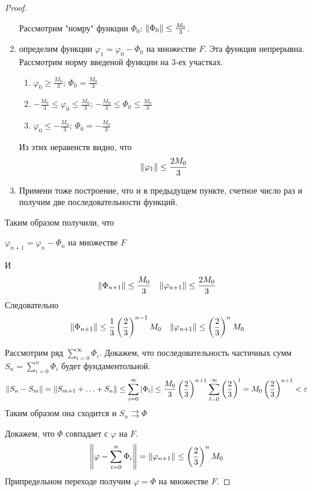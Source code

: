 \begin{proof}
\begin{enumerate}
        Рассмотрим "номру" функции $\Phi_0$: $\left\|\Phi_0\right\| \leq \frac{M_0}{3}$.
        \item определим функции $\varphi_1 = \varphi_0 - \Phi_0$ на множестве $F$. Эта функция непрерывна. Рассмотрим норму введеной функции на 3-ех участках.
        \begin{enumerate}
            \item $\varphi_0 \geq \frac{M_0}{3}$; $\Phi_0 = \frac{M_0}{3}$
            \item $ - \frac{M_0}{3} \leq \varphi_0 \leq \frac{M_0}{3}$; $-\frac{M_0}{3} \leq \Phi_0 \leq \frac{M_0}{3}$
            \item $\varphi_0 \leq -\frac{M_0}{3}$; $\Phi_0 = -\frac{M_0}{3}$
        \end{enumerate}
        Из этих неравенств видно, что
        \[
            \left\|\varphi_1\right\| \leq \frac{2 M_0}{3}
        \]
        \item Примени тоже построение, что и в предыдущем пункте, счетное число раз и получим две последовательности функций. 
    \end{enumerate}

    Таким образом получили, что
    \begin{center}
        $\varphi_{n + 1} = \varphi_n - \Phi_n$ на множестве $F$
    \end{center}
    И
    \begin{align}
        & \left\|\Phi_{n + 1}\right\| \leq \frac{M_0}{3}
        & \left\|\varphi_{n + 1}\right\| \leq \frac{2 M_0}{3}
    \end{align}
    Следовательно
    \begin{align}
        & \left\|\Phi_{n + 1}\right\| \leq \frac{1}{3} \left(\frac{2}{3}\right)^{n - 1} M_0
        & \left\|\varphi_{n + 1}\right\| \leq \left(\frac{2}{3}\right)^n M_0
    \end{align}

    Рассмотрим ряд $\sum_{i = 0}^{\infty}\Phi_i$. Докажем, что последовательность частичных сумм $S_n = \sum_{i = 0}^{n}\Phi_i$ будет фундаментольной.
    \[
        \left\|S_n - S_m\right\| = \left\|S_{m + 1} + \ldots + S_n\right\| \leq \sum_{i = 0}^{\infty}\left|\Phi_i\right| \leq \frac{M_0}{3} \left(\frac{2}{3}\right)^{n + 1} \sum_{l = 0}^{\infty} \left(\frac{2}{3}\right)^l = M_0 \left(\frac{2}{3}\right)^{n + 1} < \varepsilon
    \]
    Таким образом она сходится и $S_n \rightrightarrows \Phi$

    Докажем, что $\Phi$ совпадает с $\varphi$ на $F$.
    \[
        \left\|\varphi - \sum_{i = 0}^{n} \Phi_i\right\| = \left\|\varphi_{n + 1}\right\| \leq \left(\frac{2}{3}\right)^n M_0
    \]
    Припредельном переходе получим $\varphi = \Phi$ на множестве $F$.
\end{proof}